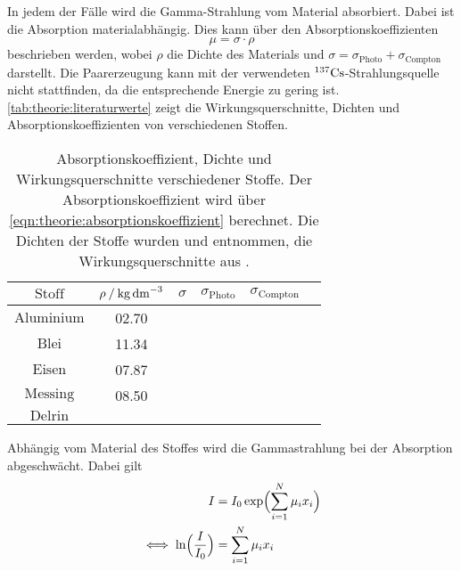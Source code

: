     In jedem der Fälle wird die Gamma-Strahlung vom Material absorbiert.
    Dabei ist die Absorption materialabhängig.
    Dies kann über den Absorptionskoeffizienten
    \begin{equation}
        \mu = \sigma \cdot \rho
        \label{eqn:theorie:absorptionskoeffizient}
    \end{equation}
    beschrieben werden,
    wobei $\rho$ die Dichte des Materials und $\sigma = \sigma_\text{Photo} + \sigma_\text{Compton}$ darstellt.
    Die Paarerzeugung kann mit der verwendeten $^{137}\ce{Cs}$-Strahlungsquelle nicht stattfinden,
    da die entsprechende Energie zu gering ist.
    \autoref{tab:theorie:literaturwerte} zeigt die Wirkungsquerschnitte,
    Dichten und Absorptionskoeffizienten von verschiedenen Stoffen.
    \begin{table}
        \centering
        \caption{Absorptionskoeffizient, Dichte und Wirkungsquerschnitte verschiedener Stoffe.
        Der Absorptionskoeffizient wird über \autoref{eqn:theorie:absorptionskoeffizient} berechnet.
        Die Dichten der Stoffe wurden \cite{dichten} und \cite{} entnommen,
        die Wirkungsquerschnitte aus \cite{crosssections}.}
        \label{tab:theorie:literaturwerte}
        \begin{tabular}{c c c c c c}
            \toprule
            $\text{Stoff}$ & $\rho \mathbin{/} \si[per-mode=reciprocal]{\kilo\gram\per\cubic\deci\meter}$ & $\sigma$ & $\sigma_\text{Photo}$ & $\sigma_\text{Compton}$ \\
            \midrule
            $\text{Aluminium}$ & 02.70 &   &   &   &   \\
            $\text{Blei}$      & 11.34 &   &   &   &   \\
            $\text{Eisen}$     & 07.87 &   &   &   &   \\
            $\text{Messing}$   & 08.50 &   &   &   &   \\
            $\text{Delrin}$    &       &   &   &   &   \\
            \bottomrule
        \end{tabular}
    \end{table}
    Abhängig vom Material des Stoffes wird die Gammastrahlung bei der Absorption abgeschwächt.
    Dabei gilt
    \begin{align}
        I &= I_0 \exp\Bigl(\sum_{i=1}^N \mu_i x_i \Bigr) \\
        \iff \ln\Bigl(\frac{I}{I_0}\Bigr) &= \sum_{i=1}^N \mu_i x_i
        \label{eqn:theorie:intensitaet2}
    \end{align}

